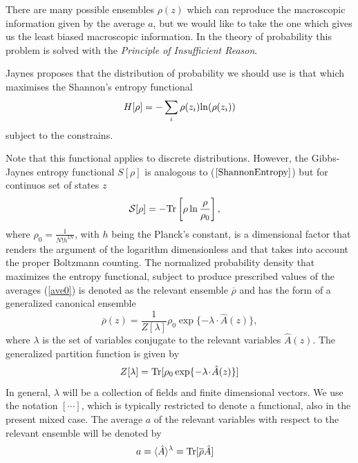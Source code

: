 \documentclass[b5paper,openright,10pt]{book}
\begin{document}
There are many possible ensembles $\rho(z)$ which can reproduce the macroscopic information given by the average $a$, but we would like to take the one which gives us the least biased macroscopic information.
In the theory of probability this problem is solved with the {\it Principle of Insufficient Reason}. 

Jaynes \cite{Jaynes1957} proposes that the distribution of probability we should use is that which maximises the Shannon's entropy functional
\begin{align}
    H[\rho] = -\sum_i\rho(z_i){\rm ln}(\rho(z_i))
    \label{ShannonEntropy}
\end{align}
subject to the constrains.

Note that this functional applies to discrete distributions. However, the Gibbs-Jaynes entropy functional $S[\rho]$ is analogous to ($\ref{ShannonEntropy}$) but for continuos set of states $z$
\begin{align}
 {\cal S}[\rho]&=-{\rm Tr}\left[\rho\ln\frac{\rho}{\rho_0}\right],
\label{entropy}
\end{align}
where  $\rho_0=\frac{1}{N!h^{3N}}$,   with  $h$  being   the  Planck's
constant, is  a dimensional  factor that renders  the argument  of the
logarithm  dimensionless  and  that  takes  into  account  the  proper
Boltzmann  counting.  The normalized  probability  density  that maximizes  the
entropy  functional,  subject  to  produce prescribed  values  of  the
averages  (\ref{ave0})  is  denoted  as the relevant  ensemble
$\overline{\rho}$ and has the form of a generalized canonical ensemble
\begin{equation}
\overline{\rho}(z) = \frac{1}{Z[\lambda]} \rho_0\exp\{-\lambda\!\cdot\!\hat{A}(z)\}, 
\label{relens1}
\end{equation}
where
$\lambda$ is the set of variables conjugate  to the relevant
variables $\hat{A}(z)$.  The generalized partition function is given by
\begin{equation}
Z[\lambda] = {\rm Tr}[\rho_0\exp
    \{-\lambda\!\cdot\!\hat{A}(z)\}]
\end{equation}
In general, $\lambda$  will be a collection of  fields and finite
dimensional  vectors.  We  use  the notation  $[\cdots]$,  which  is
typically restricted  to denote  a functional,  also in  the present
mixed case.  The average $a$ of the relevant variables with respect
to the relevant ensemble will be denoted by
\begin{align}
  a &=\langle \hat{A}\rangle^\lambda ={\rm Tr}[\overline{\rho}\hat{A}]
\end{align}
\end{document}

